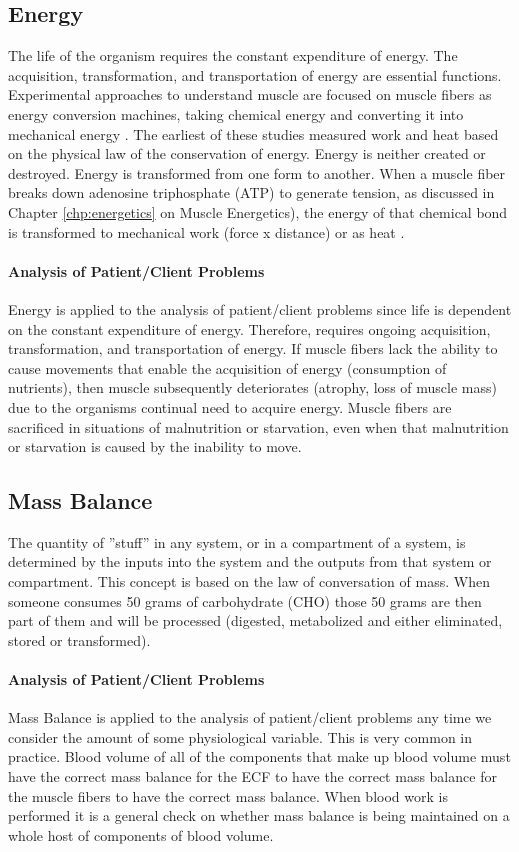 \subsection{Energy}
The life of the organism requires the constant expenditure of energy. The acquisition, transformation, and transportation of energy are essential functions. Experimental approaches to understand muscle are focused on muscle fibers as energy conversion machines, taking chemical energy and converting it into mechanical energy \cite{woledge_energetic_1985}. 
The earliest of these studies measured work and heat based on the physical law of the conservation of energy. Energy is neither created or destroyed. Energy is transformed from one form to another. When a muscle fiber breaks down adenosine triphosphate (ATP) to generate tension, as discussed in Chapter \ref{chp:energetics} on Muscle Energetics), the energy of that chemical bond is transformed to mechanical work (force x distance) or as heat \cite{hill_heat_1938}.

\paragraph{Analysis of Patient/Client Problems}
Energy is applied to the analysis of patient/client problems since life is dependent on the constant expenditure of energy. Therefore, requires ongoing acquisition, transformation, and transportation of energy. If muscle fibers lack the ability to cause movements that enable the acquisition of energy (consumption of nutrients), then muscle subsequently deteriorates (atrophy, loss of muscle mass) due to the organisms continual need to acquire energy. Muscle fibers are sacrificed in situations of malnutrition or starvation, even when that malnutrition or starvation is caused by the inability to move.

\subsection{Mass Balance}
The quantity of ”stuff” in any system, or in a compartment of a system, is determined by the inputs into the system and the outputs from that system or compartment. This concept is based on the law of conversation of mass. When someone consumes 50 grams of carbohydrate (CHO) those 50 grams are then part of them and will be processed (digested, metabolized and either eliminated, stored or transformed). 

\paragraph{Analysis of Patient/Client Problems}
Mass Balance is applied to the analysis of patient/client problems any time we consider the amount of some physiological variable. This is very common in practice. Blood volume of all of the components that make up blood volume must have the correct mass balance for the ECF to have the correct mass balance for the muscle fibers to have the correct mass balance. When blood work is performed it is a general check on whether mass balance is being maintained on a whole host of components of blood volume.


